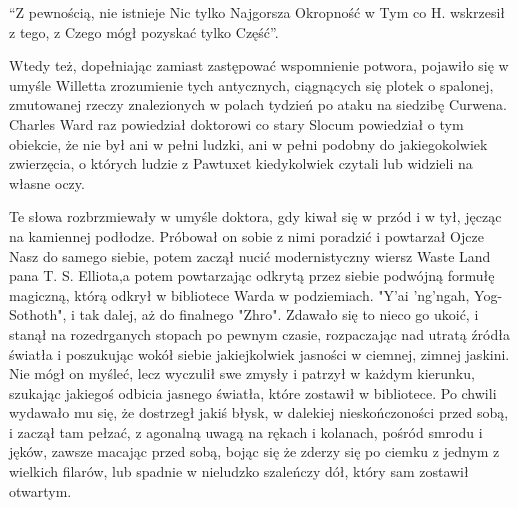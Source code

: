 ``Z pewnością, nie istnieje Nic tylko Najgorsza Okropność w Tym co H. wskrzesił z tego, z Czego mógł pozyskać tylko Część''. 

Wtedy też, dopełniając zamiast zastępować wspomnienie potwora, pojawiło się w umyśle Willetta zrozumienie tych antycznych, ciągnących się plotek o spalonej, zmutowanej rzeczy znalezionych w polach tydzień po ataku na siedzibę Curwena. Charles Ward raz powiedział doktorowi co stary Slocum powiedział o tym obiekcie, że nie był ani w pełni ludzki, ani w pełni podobny do jakiegokolwiek zwierzęcia, o których ludzie z Pawtuxet kiedykolwiek czytali lub widzieli na własne oczy. 

Te słowa rozbrzmiewały w umyśle doktora, gdy kiwał się w przód i w tył, jęcząc na kamiennej podłodze. Próbował on sobie z nimi poradzić i powtarzał Ojcze Nasz do samego siebie, potem zaczął nucić modernistyczny wiersz Waste Land pana T. S. Elliota,a potem powtarzając odkrytą przez siebie podwójną formułę magiczną, którą odkrył w bibliotece Warda w podziemiach.  "Y'ai 'ng'ngah, Yog-Sothoth", i tak dalej, aż do finalnego "Zhro". Zdawało się to nieco go ukoić, i  stanął na rozedrganych stopach po pewnym czasie, rozpaczając nad utratą źródła światła i poszukując wokół siebie jakiejkolwiek jasności w ciemnej, zimnej jaskini. Nie mógł on myśleć, lecz wyczulił swe zmysły i patrzył w każdym kierunku, szukając jakiegoś odbicia jasnego światła, które zostawił w bibliotece. Po chwili wydawało mu się, że dostrzegł jakiś błysk, w dalekiej nieskończoności przed sobą, i zaczął tam pełzać, z agonalną uwagą na rękach i kolanach,  pośród smrodu i jęków, zawsze macając przed sobą, bojąc się że zderzy się po ciemku z jednym z wielkich filarów, lub spadnie w nieludzko szaleńczy dół, który sam zostawił otwartym. 


